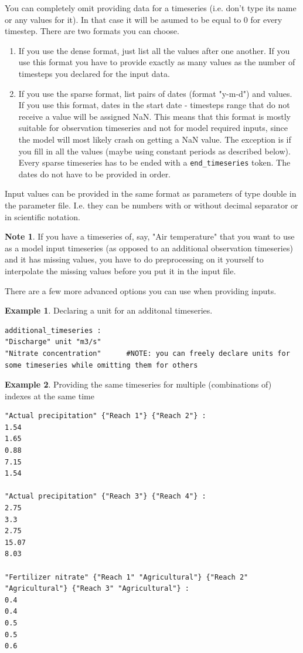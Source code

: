 \documentclass[11pt]{article}
\theoremstyle{definition}
\newtheorem{mynote}{Note}
\newenvironment{note}%
  {\begin{lrbox}{\notebox}%
   \begin{minipage}{\dimexpr\linewidth-2\fboxsep}
   \begin{mynote}}%
  {\end{mynote}%
   \end{minipage}%
   \end{lrbox}%
   \begin{trivlist}
     \item[]\colorbox{silver}{\usebox\notebox}
   \end{trivlist}}
\newtheorem{myexample}{Example}
\newenvironment{example}%
  {\begin{lrbox}{\examplebox}%
   \begin{minipage}{\dimexpr\linewidth-2\fboxsep}
   \begin{myexample}}%
  {\end{myexample}%
   \end{minipage}%
   \end{lrbox}%
   \begin{trivlist}
     \item[]\colorbox{silver}{\usebox\examplebox}
   \end{trivlist}}
\begin{document}
You can completely omit providing data for a timeseries (i.e. don't type its name or any values for it). In that case it will be asumed to be equal to 0 for every timestep. There are two formats you can choose.
\begin{enumerate}[i]
\item If you use the dense format, just list all the values after one another. If you use this format you have to provide exactly as many values as the number of timesteps you declared for the input data.
\item If you use the sparse format, list pairs of dates (format "y-m-d") and values. If you use this format, dates in the start date - timesteps range that do not receive a value will be assigned NaN. This means that this format is mostly suitable for observation timeseries and not for model required inputs, since the model will most likely crash on getting a NaN value. The exception is if you fill in all the values (maybe using constant periods as described below). Every sparse timeseries has to be ended with a {\tt end\_timeseries} token. The dates do not have to be provided in order.
\end{enumerate}
Input values can be provided in the same format as parameters of type double in the parameter file. I.e. they can be numbers with or without decimal separator or in scientific notation.

\begin{note}
If you have a timeseries of, say, "Air temperature" that you want to use as a model input timeseries (as opposed to an additional observation timeseries) and it has missing values, you have to do preprocessing on it yourself to interpolate the missing values before you put it in the input file.
\end{note}

There are a few more advanced options you can use when providing inputs.

\begin{example}\label{ex:declarewithunit}
Declaring a unit for an additonal timeseries.
\begin{lstlisting}
additional_timeseries :
"Discharge" unit "m3/s"
"Nitrate concentration"      #NOTE: you can freely declare units for some timeseries while omitting them for others
\end{lstlisting}
\end{example}

\begin{example}\label{ex:multiseries}
Providing the same timeseries for multiple (combinations of) indexes at the same time
\begin{lstlisting}
"Actual precipitation" {"Reach 1"} {"Reach 2"} :
1.54
1.65
0.88
7.15
1.54

"Actual precipitation" {"Reach 3"} {"Reach 4"} :
2.75
3.3
2.75
15.07
8.03

"Fertilizer nitrate" {"Reach 1" "Agricultural"} {"Reach 2" "Agricultural"} {"Reach 3" "Agricultural"} :
0.4
0.4
0.5
0.5
0.6
\end{lstlisting}
\end{example}
\end{document}
